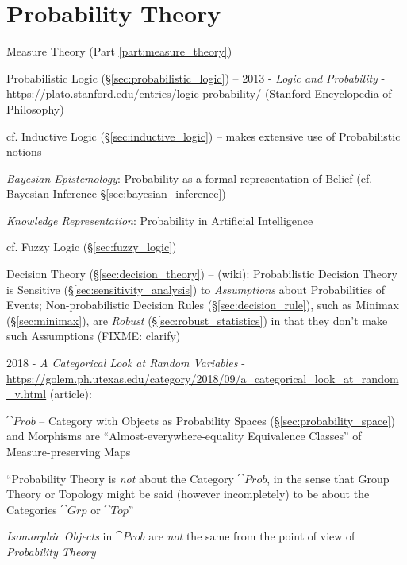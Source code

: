 \part{Probability Theory}\label{part:probability_theory}

\fist Measure Theory (Part \ref{part:measure_theory})

\fist Probabilistic Logic (\S\ref{sec:probabilistic_logic}) --
2013 - \emph{Logic and Probability} -
\url{https://plato.stanford.edu/entries/logic-probability/} (Stanford
Encyclopedia of Philosophy)

\fist cf. Inductive Logic (\S\ref{sec:inductive_logic}) -- makes extensive use
of Probabilistic notions

\emph{Bayesian Epistemology}: Probability as a formal representation of Belief
(cf. Bayesian Inference \S\ref{sec:bayesian_inference})

\emph{Knowledge Representation}: Probability in Artificial Intelligence

\fist cf. Fuzzy Logic (\S\ref{sec:fuzzy_logic})

\fist Decision Theory (\S\ref{sec:decision_theory}) --
(wiki): Probabilistic Decision Theory is Sensitive
(\S\ref{sec:sensitivity_analysis}) to \emph{Assumptions} about Probabilities of
Events; Non-probabilistic Decision Rules (\S\ref{sec:decision_rule}), such as
Minimax (\S\ref{sec:minimax}), are \emph{Robust} (\S\ref{sec:robust_statistics})
in that they don't make such Assumptions (FIXME: clarify)

2018 - \emph{A Categorical Look at Random Variables} -
\url{https://golem.ph.utexas.edu/category/2018/09/a_categorical_look_at_random_v.html} (article):

$\cat{Prob}$ -- Category with Objects as Probability Spaces
(\S\ref{sec:probability_space}) and Morphisms are ``Almost-everywhere-equality
Equivalence Classes'' of Measure-preserving Maps

``Probability Theory is \emph{not} about the Category $\cat{Prob}$, in the sense
that Group Theory or Topology might be said (however incompletely) to be about
the Categories $\cat{Grp}$ or $\cat{Top}$''

\emph{Isomorphic Objects} in $\cat{Prob}$ are \emph{not} the same from the point
of view of \emph{Probability Theory}

